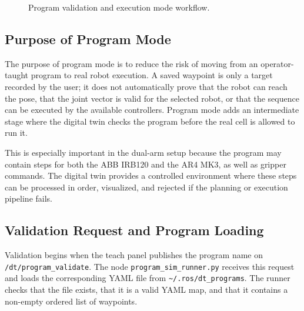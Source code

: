 \begin{figure}[H]
{%
    }
    \caption{Program validation and execution mode workflow.}
    \label{fig:dt_program_mode}
\end{figure}

\subsection{Purpose of Program Mode}

The purpose of program mode is to reduce the risk of moving from an operator-taught program to real robot execution. A saved waypoint is only a target recorded by the user; it does not automatically prove that the robot can reach the pose, that the joint vector is valid for the selected robot, or that the sequence can be executed by the available controllers. Program mode adds an intermediate stage where the digital twin checks the program before the real cell is allowed to run it.

This is especially important in the dual-arm setup because the program may contain steps for both the ABB IRB120 and the AR4 MK3, as well as gripper commands. The digital twin provides a controlled environment where these steps can be processed in order, visualized, and rejected if the planning or execution pipeline fails.

\subsection{Validation Request and Program Loading}

Validation begins when the teach panel publishes the program name on \texttt{/dt/program\_validate}. The node \texttt{program\_sim\_runner.py} receives this request and loads the corresponding YAML file from \texttt{\textasciitilde/.ros/dt\_programs}. The runner checks that the file exists, that it is a valid YAML map, and that it contains a non-empty ordered list of waypoints.

